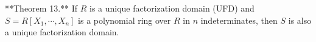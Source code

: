 **Theorem 13.** If $R$ is a unique factorization domain (UFD) and $S = R[X_1, \cdots, X_n]$ is a polynomial ring over $R$ in $n$ indeterminates, then $S$ is also a unique factorization domain.
